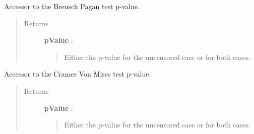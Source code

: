 \documentclass[letterpaper,10pt,english]{sphinxmanual}
\begin{document}
\begin{fulllineitems}

\begin{fulllineitems}
\label{_generated/otpod.UnivariateLinearModelAnalysis:otpod.UnivariateLinearModelAnalysis.getBreuschPaganPValue}
Accessor to the Breusch Pagan test p-value.
\begin{quote}\begin{description}
\item[{Returns}] \leavevmode
\textbf{pValue} : \href{http://doc.openturns.org/openturns-latest/sphinx/user\_manual/\_generated/openturns.NumericalPoint.html\#openturns.NumericalPoint}{}
\begin{quote}

Either the p-value for the uncensored case or for both cases.
\end{quote}

\end{description}\end{quote}

\end{fulllineitems}


\begin{fulllineitems}
\label{_generated/otpod.UnivariateLinearModelAnalysis:otpod.UnivariateLinearModelAnalysis.getCramerVonMisesPValue}
Accessor to the Cramer Von Mises test p-value.
\begin{quote}\begin{description}
\item[{Returns}] \leavevmode
\textbf{pValue} : \href{http://doc.openturns.org/openturns-latest/sphinx/user\_manual/\_generated/openturns.NumericalPoint.html\#openturns.NumericalPoint}{}
\begin{quote}

Either the p-value for the uncensored case or for both cases.
\end{quote}

\end{description}\end{quote}

\end{fulllineitems}



\end{fulllineitems}
\end{document}
